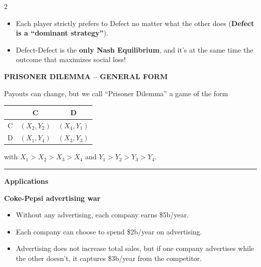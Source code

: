 \documentclass[a4paper,9pt]{extarticle}
\newcommand{\separator}{
\vspace{2pt}
\hrule
\vspace{3pt}
}
\begin{document}
\begin{multicols}{2}
\begin{example}
\end{example}


\begin{important}

\begin{itemize}

\item Each player strictly prefers to Defect no matter what the other does
(\textbf{Defect is a ``dominant strategy''}).

\item Defect-Defect is the \textbf{only Nash Equilibrium}, and it's at the same time the
outcome that maximizes social loss!

\end{itemize}

\end{important}


\begin{definition}

\textbf{PRISONER DILEMMA -- GENERAL FORM}

Payouts can change, but we call ``Prisoner Dilemma'' a game of the form

\begin{center}
\begin{tabular}{c|cc}
 & C & D \\
\hline
C & $(X_2,Y_2)$ & $(X_4,Y_1)$ \\
D & $(X_1,Y_4)$ & $(X_3,Y_3)$ \\
\end{tabular}
\end{center}

with $X_1 > X_2 > X_3 > X_4$ and $Y_1 > Y_2 > Y_3 > Y_4$.

\end{definition}


\separator


\textbf{Applications}

\begin{example}

\textbf{Coke-Pepsi advertising war}

\begin{itemize}

\item Without any advertising, each company earns \$5b/year.

\item Each company can choose to spend \$2b/year on advertising.

\item Advertising does not increase total sales, but if one company advertises while the
other doesn't, it captures \$3b/year from the competitor.


\end{itemize}
\end{example}
\end{multicols}
\end{document}
